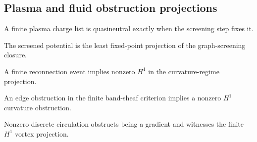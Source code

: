 \subsection{Plasma and fluid obstruction projections}

\begin{theorem}\label{thm:quasineutral-iff-screen-fixed}\leanok{}
A finite plasma charge list is quasineutral exactly when the screening step
fixes it.
\end{theorem}

\begin{theorem}\label{thm:debye-screened-potential-lfp}\leanok{}
The screened potential is the least fixed-point projection of the graph-screening
closure.
\end{theorem}

\begin{theorem}\label{thm:reconnection-h1-obstruction}\leanok{}
A finite reconnection event implies nonzero \(H^1\) in the curvature-regime
projection.
\end{theorem}

\begin{theorem}\label{thm:topological-wave-edge-h1}\leanok{}
An edge obstruction in the finite band-sheaf criterion implies a nonzero \(H^1\)
curvature obstruction.
\end{theorem}

\begin{theorem}\label{thm:vortex-h1-obstruction}\leanok{}
Nonzero discrete circulation obstructs being a gradient and witnesses the
finite \(H^1\) vortex projection.
\end{theorem}

